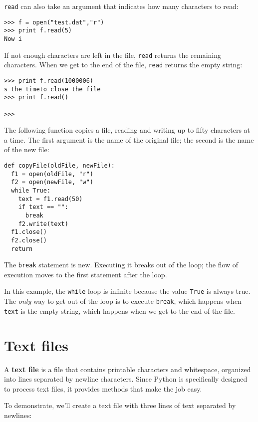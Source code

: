{\tt read} can also take an argument that indicates how many
characters to read:

\beforeverb
\begin{verbatim}
>>> f = open("test.dat","r")
>>> print f.read(5)
Now i
\end{verbatim}
\afterverb
%
If not enough characters are left in the file,
{\tt read} returns the remaining characters.
When we get to the end of the file,
{\tt read} returns the empty string:

\beforeverb
\begin{verbatim}
>>> print f.read(1000006)
s the timeto close the file
>>> print f.read()

>>>
\end{verbatim}
\afterverb
%
The following function copies a file, reading and writing
up to fifty characters at a time.  The first argument is the name of
the original file; the second is the name of the new file:

\beforeverb
\begin{verbatim}
def copyFile(oldFile, newFile):
  f1 = open(oldFile, "r")
  f2 = open(newFile, "w")
  while True:
    text = f1.read(50)
    if text == "":
      break
    f2.write(text)
  f1.close()
  f2.close()
  return
\end{verbatim}
\afterverb
%
The {\tt break} statement is new.  Executing it breaks out of the
loop; the flow of execution moves to the first statement after
the loop.


In this example, the {\tt while} loop is infinite because the
value {\tt True} is always true.  The {\em only} way to get out
of the loop is to execute {\tt break}, which happens when
{\tt text} is the empty string, which happens when we get to
the end of the file.



\section{Text files}

A {\bf text file} is a file that contains printable characters and
whitespace, organized into lines separated by newline characters.
Since Python is specifically designed to process text files, it
provides methods that make the job easy.

To demonstrate, we'll
create a text file with three lines of text separated by
newlines:

